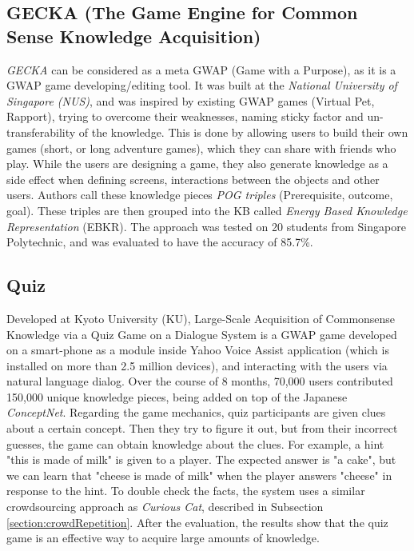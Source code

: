 \subsection{GECKA (The Game Engine for Common Sense Knowledge Acquisition)}
\label{section:r:gecka}
\emph{GECKA} can be considered as a meta GWAP (Game with a Purpose), as it is
a GWAP game developing/editing tool. It was built at the \emph{National University 
of Singapore (NUS)}, and was inspired by existing GWAP games
(Virtual Pet, Rapport), trying to overcome their weaknesses, naming sticky 
factor and un-transferability of the knowledge. This is done by allowing
users to build their own games (short, or long adventure games), which they can
share with friends who play. While the users are designing a game, they
also generate knowledge as a side effect when defining screens, interactions
between the objects and other users. Authors call these knowledge pieces
\emph{POG triples} (Prerequisite, outcome, goal). These triples are then 
grouped into the KB called \emph{Energy Based Knowledge Representation} (EBKR).
The approach was tested on 20 students from Singapore Polytechnic, and was evaluated
to have the accuracy of  85.7\%.

\subsection{Quiz}
\label{section:r:qiz}
Developed at Kyoto University (KU), Large-Scale Acquisition of Commonsense 
Knowledge via a Quiz Game on a
Dialogue System \parencite{Otani2016} is a GWAP game developed on a 
smart-phone as a module inside Yahoo Voice Assist application (which is 
installed on more than 2.5 million devices), and interacting with the users 
via natural language dialog.  Over the course of 8 months, 70,000
users contributed 150,000 unique knowledge pieces, being added on
top of the Japanese \emph{ConceptNet}. Regarding the game mechanics,
quiz participants are given clues about a certain concept. Then they try to
figure it out, but from their incorrect guesses, the game can obtain knowledge 
about the clues. For example, a hint "this is made of milk" is given to a 
player. The expected answer is "a cake", but we can learn that "cheese is made 
of milk" when the player answers "cheese" in response to the hint.
To double check the facts, the system uses a similar crowdsourcing approach as 
\emph{Curious Cat}, described in Subsection \ref{section:crowdRepetition}. After
the evaluation, the results show that the quiz game is an effective way
to acquire large amounts of knowledge.

